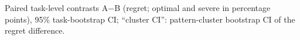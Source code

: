 \begin{table}[!htbp]
\centering
\caption{Paired task-level contrasts A$-$B (regret; optimal and severe in percentage points), 95\% task-bootstrap CI; ``cluster CI'': pattern-cluster bootstrap CI of the regret difference.}
\label{tab:llm-contrasts}
\scriptsize
\setlength{\tabcolsep}{3pt}
\resizebox{\linewidth}{!}{}
\end{table}
